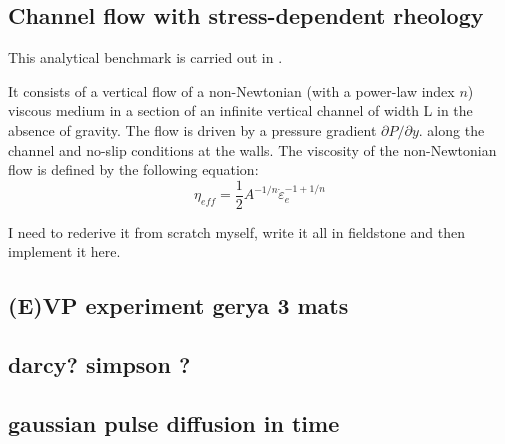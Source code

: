 \documentclass[a4paper]{article}
\begin{document}
\subsection{Channel flow with stress-dependent rheology}

This analytical benchmark is carried out in 
\textcite{geyu03,frbt19,gery10,elga10}.

It consists of a vertical flow of a non-Newtonian (with a power-law index $n$) 
viscous medium in a section of an infinite vertical channel of width L in the
absence of gravity. 
The flow is driven by a pressure gradient $\partial P/\partial y$.
along the channel and no-slip conditions at the walls.
The viscosity of the non-Newtonian flow is defined by the following 
equation:
\[
\eta_{eff} = \frac12 A^{-1/n} \dot\varepsilon_e^{-1+1/n}
\] 


{\color{red} I need to rederive it from scratch myself, 
write it all in fieldstone and then implement it here.}

\subsection{(E)VP experiment gerya 3 mats}



\subsection{darcy? simpson ?}


\subsection{gaussian pulse diffusion in time}






\newpage
\printbibliography
\end{document}
